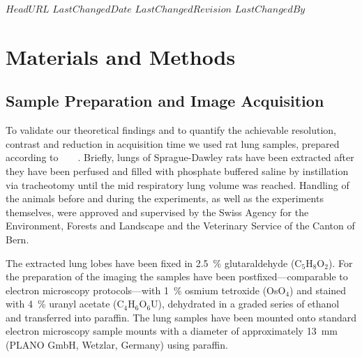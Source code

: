 \svnidlong
{$HeadURL$}
{$LastChangedDate$}
{$LastChangedRevision$}
{$LastChangedBy$}

\ifhtml
\else
\begin{center}
\end{center}
\fi

\section{Materials and Methods}%
\label{sec:materials and methods}%
\subsection{Sample Preparation and Image Acquisition}%
To validate our theoretical findings and to quantify the achievable resolution, contrast and reduction in acquisition time we used rat lung samples, prepared according  to%
\ifhtml
	~\citet{Schittny1997}
\else
	~
\fi%
\cite{Schittny1998}. Briefly, lungs of Sprague-Dawley rats have been extracted after they have been perfused and filled with phosphate buffered saline by instillation via tracheotomy until the mid respiratory lung volume was reached. Handling of the animals before and during the experiments, as well as the experiments themselves, were approved and supervised by the Swiss Agency for the Environment, Forests and Landscape and the Veterinary Service of the Canton of Bern.

The extracted lung lobes have been fixed in \SI{2.5}{\percent} glutaraldehyde (C$_5$H$_8$O$_2$). For the preparation of the imaging the samples have been postfixed---comparable to electron microscopy protocols---with \SI{1}{\percent} osmium tetroxide (OsO$_4$) and stained with \SI{4}{\percent} uranyl acetate (C$_4$H$_6$O$_6$U), dehydrated in a graded series of ethanol and transferred into paraffin. The lung samples have been mounted onto standard electron microscopy sample mounts with a diameter of approximately \SI{13}{\milli\meter} (PLANO GmbH, Wetzlar, Germany) using paraffin.


